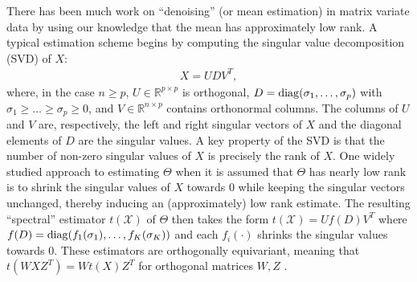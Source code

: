 There has been much work on ``denoising'' (or mean estimation) in
matrix variate data by using our knowledge that the mean has
approximately low rank. A typical estimation scheme begins by
computing the singular value decomposition (SVD) of $X$:
\begin{align}
  \label{equation:svd}
  X = UDV^T,
\end{align}
where, in the case $n \geq p$, $U \in \mathbb{R}^{p \times p}$ is
orthogonal, $D = \operatorname*{diag}(\sigma_1,\ldots,\sigma_p)$ with $\sigma_1 \geq
\ldots\geq \sigma_p \geq 0$, and $V \in \mathbb{R}^{n \times p}$
contains orthonormal columns. The columns of $U$ and $V$ are,
respectively, the left and right singular vectors of $X$ and the
diagonal elements of $D$ are the singular values. A key property of
the SVD is that the number of non-zero singular values of $X$ is
precisely the rank of $X$. One widely studied approach to estimating
$\Theta$ when it is assumed that $\Theta$ has nearly low rank is to
shrink the singular values of $X$ towards $0$ while keeping the
singular vectors unchanged, thereby inducing an (approximately) low
rank estimate. The resulting ``spectral'' estimator $t(\mathcal{X})$
of $\Theta$ then takes the form $t(\mathcal{X}) = Uf(D)V^T$ where
$f(D) = \operatorname*{diag}(f_1(\sigma_1),\ldots,f_K(\sigma_K))$ and each
$f_i(\cdot)$ shrinks the singular values towards $0$. These estimators
are orthogonally equivariant, meaning that $t(WXZ^T) = Wt(X)Z^T$ for
orthogonal matrices $W,Z$ \citep{shabalin2013reconstruction}.

